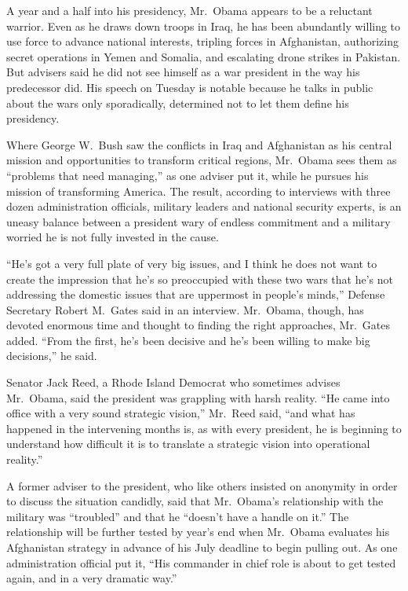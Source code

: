 ﻿\documentclass[12pt]{article}
\begin{document}
A year and a half into his presidency, Mr.~Obama appears to be a reluctant warrior. Even as he draws
down troops in Iraq, he has been abundantly willing to use force to advance national interests,
tripling forces in Afghanistan, authorizing secret operations in Yemen and Somalia, and escalating
drone strikes in Pakistan. But advisers said he did not see himself as a war president in the way
his predecessor did. His speech on Tuesday is notable because he talks in public about the wars only
sporadically, determined not to let them define his presidency.

Where George W.~Bush saw the conflicts in Iraq and Afghanistan as his central mission and
opportunities to transform critical regions, Mr.~Obama sees them as ``problems that need managing,''
as one adviser put it, while he pursues his mission of transforming America. The result, according
to interviews with three dozen administration officials, military leaders and national security
experts, is an uneasy balance between a president wary of endless commitment and a military worried
he is not fully invested in the cause.

``He's got a very full plate of very big issues, and I think he does not want to create the
impression that he's so preoccupied with these two wars that he's not addressing the domestic issues
that are uppermost in people's minds,'' Defense Secretary Robert M.~Gates said in an interview.
Mr.~Obama, though, has devoted enormous time and thought to finding the right approaches, Mr.~Gates
added. ``From the first, he's been decisive and he's been willing to make big decisions,'' he said.

Senator Jack Reed, a Rhode Island Democrat who sometimes advises Mr.~Obama, said the president was
grappling with harsh reality. ``He came into office with a very sound strategic vision,'' Mr.~Reed
said, ``and what has happened in the intervening months is, as with every president, he is beginning
to understand how difficult it is to translate a strategic vision into operational reality.''

A former adviser to the president, who like others insisted on anonymity in order to discuss the
situation candidly, said that Mr.~Obama's relationship with the military was ``troubled'' and that
he ``doesn't have a handle on it.'' The relationship will be further tested by year's end when
Mr.~Obama evaluates his Afghanistan strategy in advance of his July deadline to begin pulling out.
As one administration official put it, ``His commander in chief role is about to get tested again,
and in a very dramatic way.''
\end{document}
